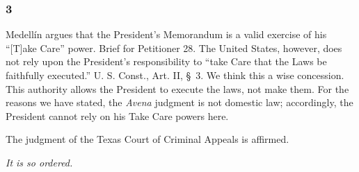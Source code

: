 \subsubsection{3}

  Medellín argues that the President's Memorandum is a valid exercise
of his ``[T]ake Care'' power. Brief for Petitioner 28. The United
States, however, does not rely upon the President's responsibility to
``take Care that the Laws be faithfully executed.'' U. S. Const.,
Art. II, \S~3. We think this a wise concession. This authority allows
the President to execute the laws, not make them. For the reasons we
have stated, the \emph{Avena} judgment is not domestic law; accordingly,
the President cannot rely on his Take Care powers here.

  The judgment of the Texas Court of Criminal Appeals is affirmed.

\begin{flushright}\emph{It is so ordered.}\end{flushright}
